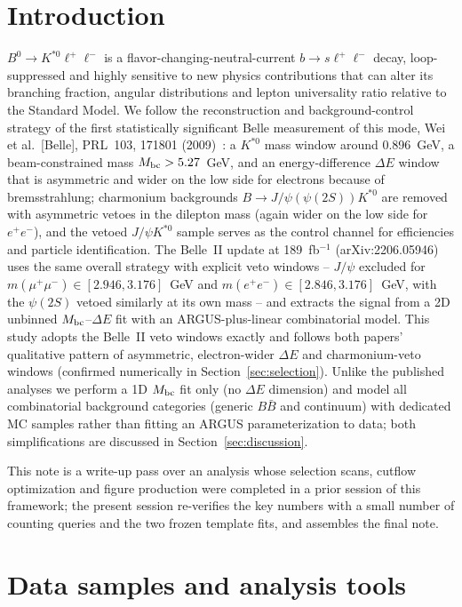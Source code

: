 \documentclass[11pt]{article}
\begin{document}
\tableofcontents

\section{Introduction}

$B^0 \to K^{*0}\ell^+\ell^-$ is a flavor-changing-neutral-current
$b\to s\ell^+\ell^-$ decay, loop-suppressed and highly sensitive to new
physics contributions that can alter its branching fraction, angular
distributions and lepton universality ratio relative to the Standard
Model. We follow the reconstruction and background-control strategy of
the first statistically significant Belle measurement of this mode,
Wei et al.~[Belle], PRL~103, 171801 (2009)~\cite{Wei2009}: a $K^{*0}$
mass window around 0.896~GeV, a beam-constrained mass
$M_{\rm bc}>5.27$~GeV, and an energy-difference $\Delta E$ window that
is asymmetric and wider on the low side for electrons because of
bremsstrahlung; charmonium backgrounds $B\to J/\psi(\psi(2S))K^{*0}$
are removed with asymmetric vetoes in the dilepton mass (again wider on
the low side for $e^+e^-$), and the vetoed $J/\psi K^{*0}$ sample
serves as the control channel for efficiencies and particle
identification. The Belle~II update at 189~fb$^{-1}$
(arXiv:2206.05946)~\cite{BelleII2022} uses the same overall strategy
with explicit veto windows -- $J/\psi$ excluded for
$m(\mu^+\mu^-)\in[2.946,3.176]$~GeV and $m(e^+e^-)\in[2.846,3.176]$~GeV,
with the $\psi(2S)$ vetoed similarly at its own mass -- and extracts
the signal from a 2D unbinned $M_{\rm bc}$--$\Delta E$ fit with an
ARGUS-plus-linear combinatorial model. This study adopts the Belle~II
veto windows exactly and follows both papers' qualitative pattern of
asymmetric, electron-wider $\Delta E$ and charmonium-veto windows
(confirmed numerically in Section~\ref{sec:selection}). Unlike the
published analyses we perform a 1D $M_{\rm bc}$ fit only (no $\Delta E$
dimension) and model all combinatorial background categories (generic
$B\bar B$ and continuum) with dedicated MC samples rather than fitting
an ARGUS parameterization to data; both simplifications are discussed
in Section~\ref{sec:discussion}.

This note is a write-up pass over an analysis whose selection scans,
cutflow optimization and figure production were completed in a prior
session of this framework; the present session re-verifies the key
numbers with a small number of counting queries and the two frozen
template fits, and assembles the final note.

\section{Data samples and analysis tools}
\end{document}
